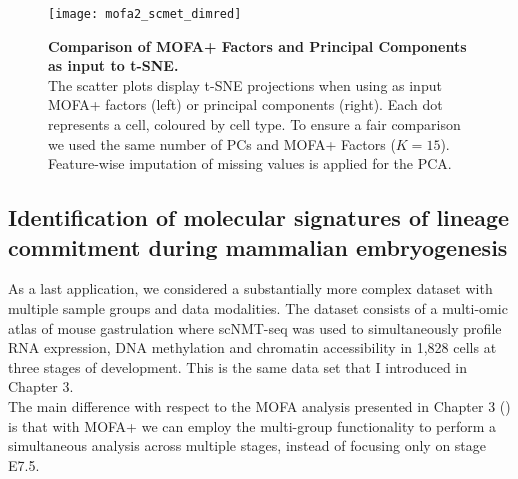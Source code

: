 \begin{figure}[H]
	\centering
	\texttt{[image: mofa2\_scmet\_dimred]}
	\caption[]{
	\textbf{Comparison of MOFA+ Factors and Principal Components as input to t-SNE.}\\
	The scatter plots display t-SNE projections when using as input MOFA+ factors (left) or principal components (right). Each dot represents a cell, coloured by cell type\cite{Luo2016}. To ensure a fair comparison we used the same number of PCs and MOFA+ Factors ($K=15$). Feature-wise imputation of missing values is applied for the PCA.
	}
	\label{fig:mofa2_scmet_dimred}
\end{figure}





\subsection{Identification of molecular signatures of lineage commitment during mammalian embryogenesis}

As a last application, we considered a substantially more complex dataset with multiple sample groups and data modalities. The dataset consists of a multi-omic atlas of mouse gastrulation where scNMT-seq was used to simultaneously profile RNA expression, DNA methylation and chromatin accessibility in 1,828 cells at three stages of development\cite{Argelaguet2019}. This is the same data set that I introduced in Chapter 3.\\
The main difference with respect to the MOFA analysis presented in Chapter 3 () is that with MOFA+ we can employ the multi-group functionality to perform a simultaneous analysis across multiple stages, instead of focusing only on stage E7.5.

